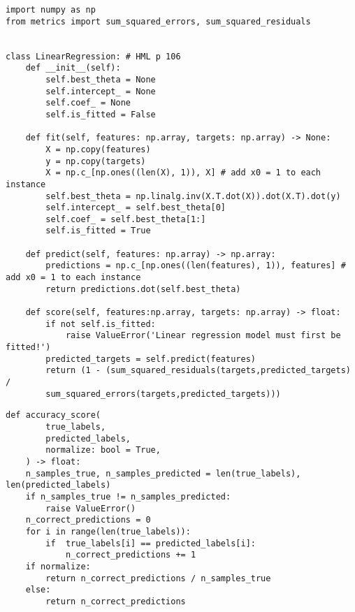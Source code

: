 \documentclass[a4paper,10pt,leqno]{article} %
\begin{document}
\begin{lstlisting}[language=fredcode]
import numpy as np
from metrics import sum_squared_errors, sum_squared_residuals


class LinearRegression: # HML p 106
    def __init__(self):
        self.best_theta = None
        self.intercept_ = None
        self.coef_ = None
        self.is_fitted = False

    def fit(self, features: np.array, targets: np.array) -> None:
        X = np.copy(features)
        y = np.copy(targets)
        X = np.c_[np.ones((len(X), 1)), X] # add x0 = 1 to each instance
        self.best_theta = np.linalg.inv(X.T.dot(X)).dot(X.T).dot(y)
        self.intercept_ = self.best_theta[0]
        self.coef_ = self.best_theta[1:]
        self.is_fitted = True
       
    def predict(self, features: np.array) -> np.array:
        predictions = np.c_[np.ones((len(features), 1)), features] # add x0 = 1 to each instance
        return predictions.dot(self.best_theta)

    def score(self, features:np.array, targets: np.array) -> float:
        if not self.is_fitted:
            raise ValueError('Linear regression model must first be fitted!')
        predicted_targets = self.predict(features)
        return (1 - (sum_squared_residuals(targets,predicted_targets) / 
        sum_squared_errors(targets,predicted_targets)))
\end{lstlisting}

\begin{lstlisting}[language=fredcode]
def accuracy_score(
        true_labels,
        predicted_labels,
        normalize: bool = True,
    ) -> float:   
    n_samples_true, n_samples_predicted = len(true_labels), len(predicted_labels)
    if n_samples_true != n_samples_predicted:
        raise ValueError()
    n_correct_predictions = 0
    for i in range(len(true_labels)):
        if  true_labels[i] == predicted_labels[i]:
            n_correct_predictions += 1
    if normalize:
        return n_correct_predictions / n_samples_true
    else:
        return n_correct_predictions

\end{lstlisting}
\end{document}
